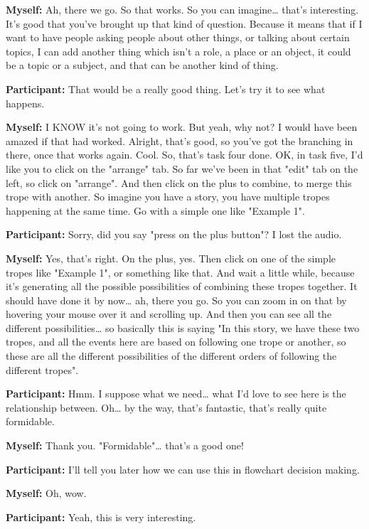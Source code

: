 \documentclass[11pt]{report}
\begin{document}
\begin{linenumbers}
\textbf{Myself:} Ah, there we go. So that works. So you can imagine\ldots{} that's interesting. It's good that you've brought up that kind of question. Because it means that if I want to have people asking people about other things, or talking about certain topics, I can add another thing which isn't a role, a place or an object, it could be a topic or a subject, and that can be another kind of thing.

\textbf{Participant:} That would be a really good thing. Let's try it to see what happens.

\textbf{Myself:} I KNOW it's not going to work. But yeah, why not? I would have been amazed if that had worked. Alright, that's good, so you've got the branching in there, once that works again. Cool. So, that's task four done. OK, in task five, I'd like you to click on the "arrange" tab. So far we've been in that "edit" tab on the left, so click on "arrange". And then click on the plus to combine, to merge this trope with another. So imagine you have a story, you have multiple tropes happening at the same time. Go with a simple one like "Example 1".

\textbf{Participant:} Sorry, did you say "press on the plus button"? I lost the audio.

\textbf{Myself:} Yes, that's right. On the plus, yes. Then click on one of the simple tropes like "Example 1", or something like that. And wait a little while, because it's generating all the possible possibilities of combining these tropes together. It should have done it by now\ldots{} ah, there you go. So you can zoom in on that by hovering your mouse over it and scrolling up. And then you can see all the different possibilities\ldots{} so basically this is saying "In this story, we have these two tropes, and all the events here are based on following one trope or another, so these are all the different possibilities of the different orders of following the different tropes".

\textbf{Participant:} Hmm. I suppose what we need\ldots{} what I'd love to see here is the relationship between. Oh\ldots{} by the way, that's fantastic, that's really quite formidable.

\textbf{Myself:} Thank you. "Formidable"\ldots{} that's a good one!

\textbf{Participant:} I'll tell you later how we can use this in flowchart decision making.

\textbf{Myself:} Oh, wow.

\textbf{Participant:} Yeah, this is very interesting.


\end{linenumbers}
\end{document}
